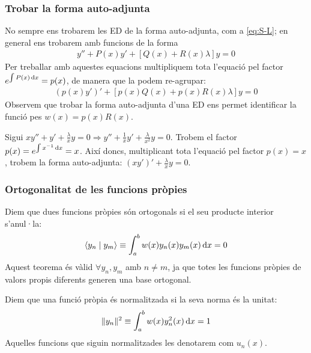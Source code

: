 \subsubsection*{Trobar la forma auto-adjunta}
No sempre ens trobarem les ED de la forma auto-adjunta, com a \eqref{eq:S-L}; en general ens trobarem amb funcions de la forma
\begin{align}
    y'' + P(x)y' + [Q(x) + R(x) \lambda]y = 0
\end{align}
Per treballar amb aquestes equacions multipliquem tota l'equació pel factor $e^{\int P(x) \mathop{}\!\mathrm{d} x} = p(x)$, de manera que la podem re-agrupar:
\begin{align}
    (p(x) y')' + [p(x)Q(x) + p(x)R(x)\lambda]y = 0
\end{align}
Observem que trobar la forma auto-adjunta d'una ED ens permet identificar la funció pes $w(x) = p(x)R(x)$.

\begin{example}
    Sigui $\displaystyle xy'' + y' + \frac{\lambda}{x} y = 0 \Rightarrow y'' + \frac{1}{x}y' + \frac{\lambda}{x^{2}} y = 0$. Trobem el factor $p(x) = e^{\int x^{-1} \mathop{}\!\mathrm{d} x} = x$. Així doncs, multiplicant tota l'equació pel factor $p(x) = x$, trobem la forma auto-adjunta: $\boxed{(x y')' + \frac{\lambda}{x}y = 0}$.
\end{example}

\subsubsection*{Ortogonalitat de les funcions pròpies}
\begin{thm}
    Diem que dues funcions pròpies són ortogonals si el seu producte interior s'anul·la:
    \begin{align}
        \left< y_{n} \mid y_{m} \right> \equiv \int_{a}^{b} w(x) y_{n}(x) y_{m}(x) \mathop{}\!\mathrm{d} x = 0
    \end{align}
    Aquest teorema és vàlid $\forall y_{n}, y_{m}$ amb $n \neq m$, ja que totes les funcions pròpies de valors propis diferents generen una base ortogonal.
\end{thm}

\begin{thm}
    Diem que una funció pròpia és normalitzada si la seva norma és la unitat:
    \begin{align}
        \| y_{n} \|^{2} \equiv \int_{a}^{b} w(x) y_{n}^{2}(x) \mathop{}\!\mathrm{d} x = 1
    \end{align}
    Aquelles funcions que siguin normalitzades les denotarem com $u_{n}(x)$.
\end{thm}

